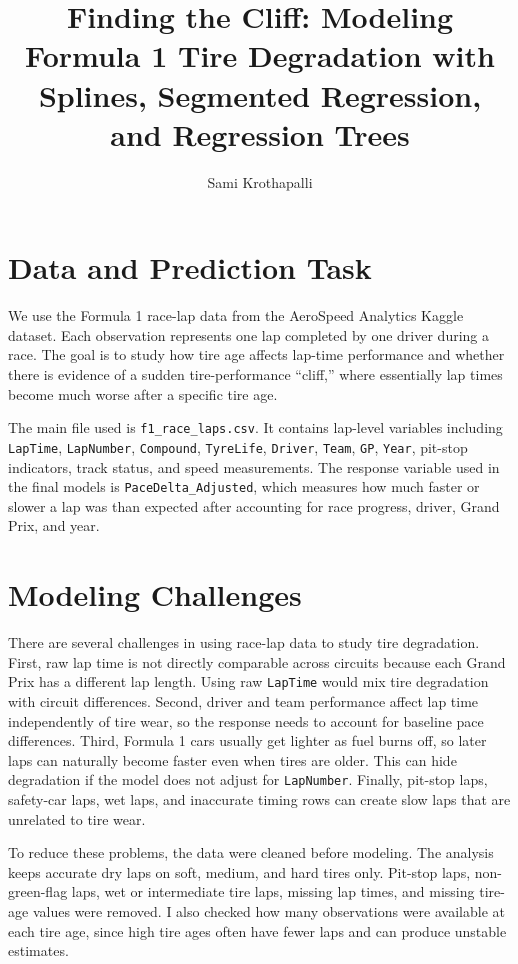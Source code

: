 \documentclass[11pt]{article}
\title{Finding the Cliff: Modeling Formula 1 Tire Degradation with Splines, Segmented Regression, and Regression Trees}
\author{Sami Krothapalli}
\date{}
\begin{document}
\maketitle

\section{Data and Prediction Task}

We use the Formula 1 race-lap data from the AeroSpeed Analytics Kaggle dataset. Each observation represents one lap completed by one driver during a race. 
The goal is to study how tire age affects lap-time performance and whether there is evidence of a sudden tire-performance ``cliff,'' where essentially lap 
times become much worse after a specific tire age.

The main file used is \texttt{f1\_race\_laps.csv}. It contains lap-level variables including \texttt{LapTime}, \texttt{LapNumber}, \texttt{Compound}, 
\texttt{TyreLife}, \texttt{Driver}, \texttt{Team}, \texttt{GP}, \texttt{Year}, pit-stop indicators, track status, and speed measurements. The response 
variable used in the final models is \texttt{PaceDelta\_Adjusted}, which measures how much faster or slower a lap was than expected after accounting for 
race progress, driver, Grand Prix, and year.


\section{Modeling Challenges}

There are several challenges in using race-lap data to study tire degradation. First, raw lap time is not directly comparable across circuits because 
each Grand Prix has a different lap length. Using raw \texttt{LapTime} would mix tire degradation with circuit differences. Second, driver and team 
performance affect lap time independently of tire wear, so the response needs to account for baseline pace differences. Third, Formula 1 cars usually 
get lighter as fuel burns off, so later laps can naturally become faster even when tires are older. This can hide degradation if the model does not adjust 
for \texttt{LapNumber}. Finally, pit-stop laps, safety-car laps, wet laps, and inaccurate timing rows can create slow laps that are unrelated to tire wear.

To reduce these problems, the data were cleaned before modeling. The analysis keeps accurate dry laps on soft, medium, and hard tires only. Pit-stop laps,
non-green-flag laps, wet or intermediate tire laps, missing lap times, and missing tire-age values were removed. I also checked how many observations were 
available at each tire age, since high tire ages often have fewer laps and can produce unstable estimates.
\end{document}

